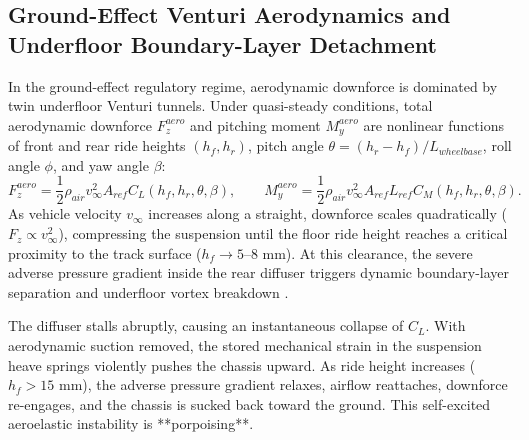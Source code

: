 \documentclass[11pt,a4paper,reqno]{article}
\def\mathrm#1{#1}%
\theoremstyle{plain}
\theoremstyle{definition}
\theoremstyle{remark}
\numberwithin{equation}{section}
\begin{document}
\subsection{Ground-Effect Venturi Aerodynamics and Underfloor Boundary-Layer Detachment}
In the ground-effect regulatory regime, aerodynamic downforce is dominated by twin underfloor Venturi tunnels. Under quasi-steady conditions, total aerodynamic downforce $F_z^{\mathrm{aero}}$ and pitching moment $M_y^{\mathrm{aero}}$ are nonlinear functions of front and rear ride heights $(h_f, h_r)$, pitch angle $\theta = (h_r - h_f) / L_{\mathrm{wheelbase}}$, roll angle $\phi$, and yaw angle $\beta$:
\begin{equation}
  F_z^{\mathrm{aero}} = \frac{1}{2}\rho_{\mathrm{air}} v_{\infty}^2 A_{\mathrm{ref}} C_L(h_f, h_r, \theta, \beta), \qquad M_y^{\mathrm{aero}} = \frac{1}{2}\rho_{\mathrm{air}} v_{\infty}^2 A_{\mathrm{ref}} L_{\mathrm{ref}} C_M(h_f, h_r, \theta, \beta).
  \label{eq:quasi_steady_aero}
\end{equation}
As vehicle velocity $v_\infty$ increases along a straight, downforce scales quadratically ($F_z \propto v_\infty^2$), compressing the suspension until the floor ride height reaches a critical proximity to the track surface ($h_f \to 5\text{--}8\text{ mm}$). At this clearance, the severe adverse pressure gradient inside the rear diffuser triggers dynamic boundary-layer separation and underfloor vortex breakdown \cite{ZhangZerihan2003}.

The diffuser stalls abruptly, causing an instantaneous collapse of $C_L$. With aerodynamic suction removed, the stored mechanical strain in the suspension heave springs violently pushes the chassis upward. As ride height increases ($h_f > 15\text{ mm}$), the adverse pressure gradient relaxes, airflow reattaches, downforce re-engages, and the chassis is sucked back toward the ground. This self-excited aeroelastic instability is **porpoising**.
\end{document}
